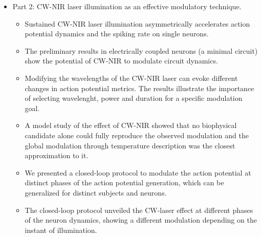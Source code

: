 \begin{itemize}
\begin{itemize}
 \end{itemize}
	\item Part 2: CW-NIR laser illumination as an effective modulatory technique.
     \begin{itemize}
         \item Sustained CW-NIR laser illumination asymmetrically accelerates action potential dynamics and the spiking rate on single neurons.
         \item The preliminary results in electrically coupled neurons (a minimal circuit) show the potential of CW-NIR to modulate circuit dynamics.
         \item    Modifying the wavelengths of the CW-NIR laser can evoke different changes in action potential metrics. The results illustrate the importance of selecting  wavelenght, power and duration for a specific modulation goal.
         \item A model study of the effect of CW-NIR showed that no biophysical candidate alone could fully reproduce the observed modulation and the global modulation through temperature description was the closest approximation to it.
         \item We presented a closed-loop protocol to modulate the action potential at distinct phases of the action potential generation, which can be generalized for distinct subjects and neurons.
         \item The closed-loop protocol unveiled the CW-laser effect at different phases of the neuron dynamics,  showing a different modulation depending on the instant of illumination.
     \end{itemize}
\end{itemize}


